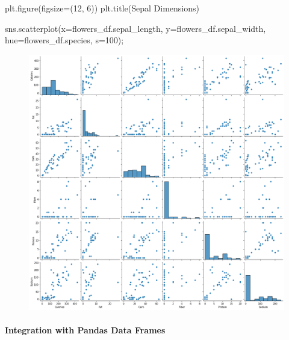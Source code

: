 \documentclass[
  letterpaper,
  DIV=11,
  numbers=noendperiod]{scrreprt}
\let\oldparagraph\paragraph
\renewcommand{\paragraph}[1]{\oldparagraph{#1}\mbox{}}
\newenvironment{Shaded}{\begin{snugshade}}{\end{snugshade}}
\newcommand{\DecValTok}[1]{\textcolor[rgb]{0.68,0.00,0.00}{#1}}
\newcommand{\NormalTok}[1]{\textcolor[rgb]{0.00,0.23,0.31}{#1}}
\newcommand{\OperatorTok}[1]{\textcolor[rgb]{0.37,0.37,0.37}{#1}}
\newcommand{\StringTok}[1]{\textcolor[rgb]{0.13,0.47,0.30}{#1}}
\begin{document}
\begin{Shaded}
\begin{Highlighting}[]
\NormalTok{plt.figure(figsize}\OperatorTok{=}\NormalTok{(}\DecValTok{12}\NormalTok{, }\DecValTok{6}\NormalTok{))}
\NormalTok{plt.title(}\StringTok{\textquotesingle{}Sepal Dimensions\textquotesingle{}}\NormalTok{)}

\NormalTok{sns.scatterplot(x}\OperatorTok{=}\NormalTok{flowers\_df.sepal\_length, }
\NormalTok{                y}\OperatorTok{=}\NormalTok{flowers\_df.sepal\_width, }
\NormalTok{                hue}\OperatorTok{=}\NormalTok{flowers\_df.species,}
\NormalTok{                s}\OperatorTok{=}\DecValTok{100}\NormalTok{)}\OperatorTok{;}
\end{Highlighting}
\end{Shaded}

\begin{figure}[H]

{\centering \includegraphics{Data visualization_files/figure-pdf/cell-43-output-1.png}

}

\end{figure}

\hypertarget{integration-with-pandas-data-frames}{%
\paragraph{Integration with Pandas Data
Frames}\label{integration-with-pandas-data-frames}}
\end{document}
